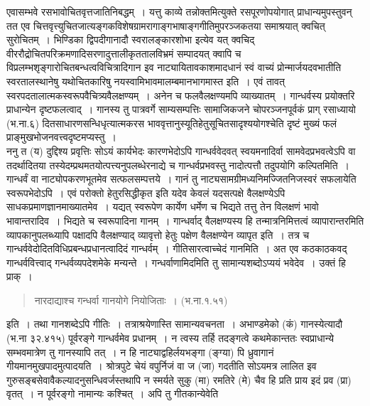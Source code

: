 \documentclass[11pt, openany]{book}
\makeatletter
\newcommand{\devanagarinumeral}[1]{%
	\devanagaridigits{\number \csname c@#1\endcsname}} %
\makeatother
\begin{document}
\fancyhead[CE]{\rule{0.7\linewidth}{0.5pt}}
\fancyhead[CO]{\rule{0.6\linewidth}{0.5pt}}
\fancyhead[LE,RO]{\thepage}
\cfoot{}
\renewcommand{\thepage}{\devanagarinumeral{page}}
\setcounter{page}{402}

\noindent
एवासम्भवे रसभावोचितवृत्तजातिनिबद्धम्~। यत्तु काव्ये तन्नोक्तमित्युक्ते रसपूरणोपयोगात् प्राधान्यमुपस्तुवन् तत एव चित्तवृत्त्युचितजात्यङ्गकविशेषग्रामरागाङ्गभाषाङ्गगीतिमुपरञ्जकतया समाश्रयात् क्वचित् सुरोचितम्~। भिण्डिका द्विपदीगानादौ स्वरालङ्कारशोभा इत्येव यत् क्वचिद् वीररौद्रोचितपरिक्रमणादिसरणादुत्तालीकृततालविभ्रमं सम्पादयत् क्वापि च विप्रलम्भशृङ्गारोचितबन्धत्वविचित्रादिगान इव नाट्यायितावकाशमादधानं स्वं वाच्यं प्रोन्मार्जयदवभातीति स्वरतालस्थानेषु यथोचितकारिषु नयस्वामिभावमालम्बमानभागमास्त इति~। एवं तावत् स्वरपदतालात्मकस्वरूपवैचित्र्यवैलक्षण्यम्~। अनेन च फलवैलक्षण्यमपि व्याख्यातम्~। गान्धर्वस्य प्रयोक्तरि प्राधान्येन दृष्टफलत्वाद्~। गानस्य तु पात्रवर्गे साम्यसम्पत्तिः सामाजिकजने चोपरञ्जनपूर्वकं प्राग् {\qtt रसाध्यायो} (भ.ना.६) दितसाधारणसन्धिधृत्यात्मकरस भाववृत्तानुस्यूतिहेतुसूचितसादृश्ययोगश्चेति दृष्टं मुख्यं फलं प्राङ्मुखभोजनवत्त्वदृष्टमप्यस्तु~।\\

ननु त (य) दुद्दिश्य प्रवृत्तिः सोऽयं कार्यभेदः कारणभेदोऽपि गान्धर्ववेदवत् स्वयमनादिर्वा सामवेदप्रभवत्वेऽपि वा तदर्थादितया तस्येदम्प्रथमतयोत्पत्त्यनुपलब्धेरनाद्ये च गान्धर्वप्रभवस्तु नादोत्पत्तौ तदुपयोगि कल्पितमिति~। गान्धर्वं वा नाट्योपकरणभूतमेव सत्फलसम्पत्तये~। गानं तु नाट्यसामग्रीमध्यनिमज्जितनिजस्वरं सफलायेति स्वरूपभेदोऽपि~। एवं परोक्तो हेतुरसिद्धीकृत इति यदेव केवलं यदसत्पक्षे वैलक्षण्येऽपि साधकप्रमाणज्ञानमाख्यातमेव~। यद्यत् स्वरूपेण कार्येण धर्मेण च भिद्यते तत्तु तेन विलक्षणं भावो भावान्तरादिव~। भिद्यते च स्वरूपादिना गानम्~। गान्धर्वाद् वैलक्षण्यस्य हि तन्मात्रनिमित्तत्वं व्यापारान्तरमिति व्यापकानुपलब्ध्यापि पक्षादपि वैलक्षण्याद् व्यावृत्तो हेतुः पक्षेण वैलक्षण्येन व्यापृत इति~। तत्र च गान्धर्ववेदोदितविधिप्रबन्धप्रधानत्वादिदं गान्धर्वम्~। गीतिसारत्वाच्चेदं गानमिति~। अत एव कठकाठकवद् गान्धर्ववित्त्वाद् गन्धर्वव्यपदेशमेके मन्यन्ते~। गन्धर्वाणामिदमिति तु सामान्यशब्दोऽप्ययं भवेदेव~। उक्तं हि प्राक्~।

\begin{quote}
{\qt नारदाद्याश्च गन्धर्वा गानयोगे नियोजिताः~। (भ.ना.१.५१) }
\end{quote}

\noindent
इति~। तथा गानशब्देऽपि गीतिः~। तत्राश्रयेणास्ति सामान्यवचनता~। अभाण्डमेको (कं) गानस्येत्यादौ (भ.ना ३२.४१५) पूर्वरङ्गे गान्धर्वमेव प्रधानम्~। न त्वस्य तर्हि तदङ्गत्वे कथमेकान्ततः स्वप्राधान्ये सम्भवमात्रेण तु गानस्यापि तत्~। न हि नाट्याद्वहिर्लयभङ्गा (ङ्ग्या) पि ध्रुवागानं गीयमानमुखपादमुत्पादयति~। श्रोत्रपुटे चेयं वपुर्निजं वा ज (जा) गदतीति सोऽयमत्र लालित इव गुरुसङ्बसेवावैकल्यादनुसन्धिवर्जस्तथापि न स्मर्यते सुकु (मा) रमतिरे (मे) चैव हि प्रति प्राय इदं प्रव (प्रा) वृतत्~। न पूर्वरङ्गो नामान्यः कश्चित्~। अपि तु गीतकान्येवेति 
\end{document}

